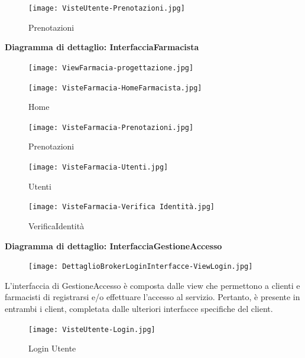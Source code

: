 \begin{figure}[h!]
    \centering
    \texttt{[image: VisteUtente-Prenotazioni.jpg]}
    \caption{Prenotazioni}
\end{figure}

\newpage

\textbf{Diagramma di dettaglio: InterfacciaFarmacista}
\begin{figure}[h!]
    \begin{center}
        \texttt{[image: ViewFarmacia-progettazione.jpg]}
    \end{center}
\end{figure}

\begin{figure}[h!]
    \centering
    \texttt{[image: VisteFarmacia-HomeFarmacista.jpg]}
    \caption{Home}
\end{figure}
\newpage

\begin{figure}[h!]
    \centering
    \texttt{[image: VisteFarmacia-Prenotazioni.jpg]}
    \caption{Prenotazioni}
\end{figure}

\begin{figure}[h!]
    \centering
    \texttt{[image: VisteFarmacia-Utenti.jpg]}
    \caption{Utenti}
\end{figure}
\newpage

\begin{figure}[h!]
    \centering
    \texttt{[image: VisteFarmacia-Verifica Identità.jpg]}
    \caption{VerificaIdentità}
\end{figure}

\vspace{3em}

\textbf{Diagramma di dettaglio: InterfacciaGestioneAccesso}
\begin{figure}[h!]
    \begin{center}
        \texttt{[image: DettaglioBrokerLoginInterfacce-ViewLogin.jpg]}
    \end{center}
\end{figure}

L'interfaccia di GestioneAccesso è composta dalle view che permettono a clienti e farmacisti di registrarsi e/o effettuare l'accesso al servizio.
Pertanto, è presente in entrambi i client, completata dalle ulteriori interfacce specifiche del client.
\\

\begin{figure}[h!]
    \centering
    \texttt{[image: VisteUtente-Login.jpg]}
    \caption{Login Utente}
\end{figure}

